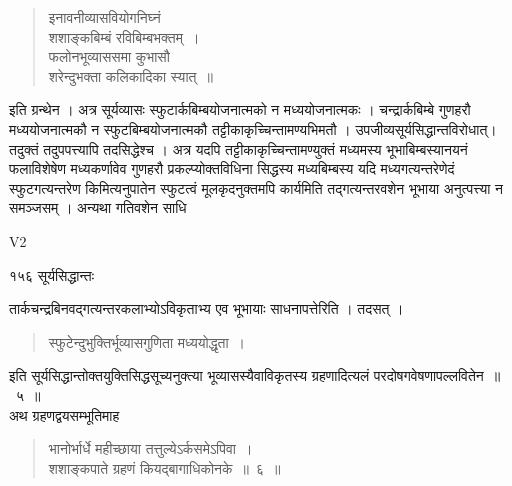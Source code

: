 \documentclass[11pt, openany]{book}
\begin{document}
\begin{quote}
 {\qt इनावनीव्यासवियोगनिघ्नं\\
शशाङ्कबिम्बं रविबिम्बभक्तम्~।\\
फलोनभूव्याससमा कुभासौ\\
शरेन्दुभक्ता कलिकादिका स्यात्~॥}
\end{quote}
\begin{sloppypar}
इति ग्रन्थेन । अत्र सूर्यव्यासः स्फुटार्कबिम्बयोजनात्मको न मध्ययोजनात्मकः । चन्द्रार्कबिम्बे गुणहरौ मध्ययोजनात्मकौ न स्फुटबिम्बयोजनात्मकौ तट्टीकाकृच्चिन्तामण्यभिमतौ । उपजीव्यसूर्यसिद्धान्तविरोधात्। तदुक्तं तदुपपत्त्यापि तदसिद्धेश्च । अत्र यदपि तट्टीकाकृच्चिन्तामण्युक्तं मध्यमस्य भूभाबिम्बस्यानयनं फलाविशेषेण मध्यकर्णावेव गुणहरौ प्रकल्प्योक्तविधिना सिद्धस्य मध्यबिम्बस्य यदि मध्यगत्यन्तरेणेदं स्फुटगत्यन्तरेण किमित्यनुपातेन स्फुटत्वं मूलकृदनुक्तमपि कार्यमिति तद्गत्यन्तरवशेन भूभाया अनुत्पत्त्या न समञ्जसम् । अन्यथा गतिवशेन साधि\textendash
\end{sloppypar}

{\tiny{V2}}

\newpage



\noindent १५६ \hspace{4cm} सूर्यसिद्धान्तः 
\vspace{1cm}


\noindent तार्कचन्द्रबिनवद्गत्यन्तरकलाभ्योऽविकृताभ्य एव भूभायाः साधनापत्तेरिति । तदसत् ।


\begin{quote}
 {\qt स्फुटेन्दुभुक्तिर्भूव्यासगुणिता मध्ययोद्धृता~।}
\end{quote}
\begin{sloppypar}
इति सूर्यसिद्धान्तोक्तयुक्तिसिद्धसूच्यनुक्त्या भूव्यासस्यैवाविकृतस्य ग्रहणादित्यलं परदोषगवेषणापल्लवितेन~॥~५~॥\\
\noindent अथ ग्रहणद्वयसम्भूतिमाह\textendash
\end{sloppypar}


\begin{quote}
 {\ssi भानोर्भार्धे महीच्छाया तत्तुल्येऽर्कसमेऽपिवा~।\\
शशाङ्कपाते ग्रहणं कियद्बागाधिकोनके~॥~६~॥}
\end{quote}
\end{document}
